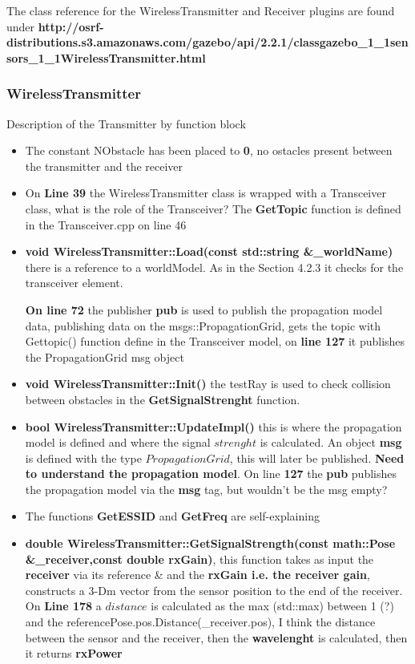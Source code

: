 \documentclass[11pt,a4paper]{article}
\begin{document}
\vskip 0.2cm

The class reference for the WirelessTransmitter and Receiver plugins are found under \textbf{http://osrf-distributions.s3.amazonaws.com/gazebo/api/2.2.1/classgazebo{\_}1{\_}1sensors{\_}1{\_}1WirelessTransmitter.html}



\subsubsection{WirelessTransmitter}

Description of the Transmitter by function block

\begin{itemize}
\item The constant NObstacle has been placed to \textbf{0}, no ostacles present between the transmitter and the receiver
\item On \textbf{Line 39} the WirelessTransmitter class is wrapped with a Transceiver class, what is the role of the Transceiver? The \textbf{GetTopic} function is defined in the Transceiver.cpp on line 46
\item \textbf{void WirelessTransmitter::Load(const std::string \&{\_}worldName)} there is a reference to a worldModel. As in the Section 4.2.3 it checks for the transceiver element.

\textbf{On line 72} the publisher \textbf{pub} is used to publish the propagation model data, publishing data on the msgs::PropagationGrid, gets the topic with Gettopic() function define in the Transceiver model, on \textbf{line 127} it publishes the PropagationGrid msg object
\item \textbf{void WirelessTransmitter::Init()} the testRay is used to check collision between obstacles in the \textbf{GetSignalStrenght} function.
\item \textbf{bool WirelessTransmitter::UpdateImpl()} this is where the propagation model is defined and where the signal $strenght$ is calculated. An object \textbf{msg} is defined with the type $PropagationGrid$, this will later be published. \textbf{Need to understand the propagation model}. On line \textbf{127} the \textbf{pub} publishes the propagation model via the \textbf{msg} tag, but wouldn't be the msg empty?
\item The functions \textbf{GetESSID} and \textbf{GetFreq} are self-explaining
\item \textbf{double WirelessTransmitter::GetSignalStrength(const math::Pose \&{\_}receiver,const double rxGain)}, this function takes as input the \textbf{receiver} via its reference \& and the \textbf{rxGain i.e. the receiver gain}, constructs a 3-Dm vector from the sensor position to the end of the receiver. On \textbf{Line 178} a $distance$ is calculated as the max (std::max) between 1 (?) and the referencePose.pos.Distance({\_}receiver.pos), I think the distance between the sensor and the receiver, then the \textbf{wavelenght} is calculated, then it returns \textbf{rxPower}

\end{itemize}
\end{document}
